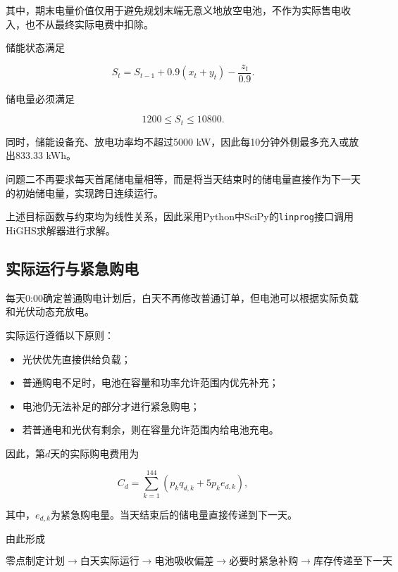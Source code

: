 其中，期末电量价值仅用于避免规划末端无意义地放空电池，不作为实际售电收入，也不从最终实际电费中扣除。

储能状态满足

\begin{equation}
S_t
=
S_{t-1}
+
0.9(x_t+y_t)
-
\frac{z_t}{0.9}.
\end{equation}

储电量必须满足

\begin{equation}
1200\leq S_t\leq10800.
\end{equation}

同时，储能设备充、放电功率均不超过5000 kW，因此每10分钟外侧最多充入或放出$833.33$ kWh。

问题二不再要求每天首尾储电量相等，而是将当天结束时的储电量直接作为下一天的初始储电量，实现跨日连续运行。

上述目标函数与约束均为线性关系，因此采用Python中SciPy的\texttt{linprog}接口调用HiGHS求解器进行求解。


\subsection{实际运行与紧急购电}

每天0:00确定普通购电计划后，白天不再修改普通订单，但电池可以根据实际负载和光伏动态充放电。

实际运行遵循以下原则：

\begin{itemize}
    \item 光伏优先直接供给负载；
    \item 普通购电不足时，电池在容量和功率允许范围内优先补充；
    \item 电池仍无法补足的部分才进行紧急购电；
    \item 若普通电和光伏有剩余，则在容量允许范围内给电池充电。
\end{itemize}

因此，第$d$天的实际购电费用为

\begin{equation}
C_d
=
\sum_{k=1}^{144}
\left(
p_kq_{d,k}
+
5p_ke_{d,k}
\right),
\end{equation}

其中，$e_{d,k}$为紧急购电量。当天结束后的储电量直接传递到下一天。

由此形成

\[
\text{零点制定计划}
\rightarrow
\text{白天实际运行}
\rightarrow
\text{电池吸收偏差}
\rightarrow
\text{必要时紧急补购}
\rightarrow
\text{库存传递至下一天}
\]

